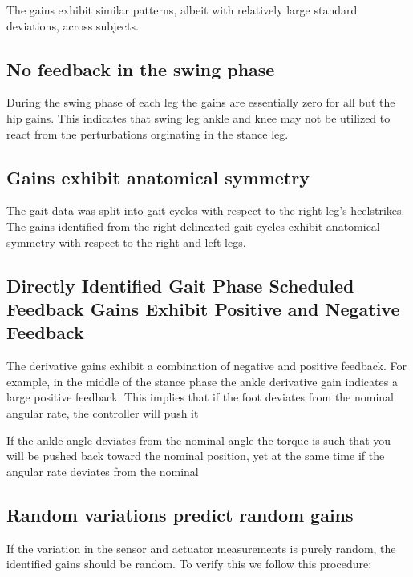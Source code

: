 \documentclass{article}
\begin{document}
The gains exhibit similar patterns, albeit with relatively large standard
deviations, across subjects.

\subsection*{No feedback in the swing phase}
%
During the swing phase of each leg the gains are essentially zero for all but
the hip gains. This indicates that swing leg ankle and knee may not be utilized
to react from the perturbations orginating in the stance leg.


\subsection*{Gains exhibit anatomical symmetry}
%
The gait data was split into gait cycles with respect to the right leg's
heelstrikes. The gains identified from the right delineated gait cycles exhibit
anatomical symmetry with respect to the right and left legs.

\subsection*{Directly Identified Gait Phase Scheduled Feedback Gains Exhibit
  Positive and Negative Feedback}
%
The derivative gains exhibit a combination of negative and positive feedback.
For example, in the middle of the stance phase the ankle derivative gain
indicates a large positive feedback. This implies that if the foot deviates
from the nominal angular rate, the controller will push it

If the ankle angle deviates from the nominal angle the torque is such that you
will be pushed back toward the nominal position, yet at the same time if the
angular rate deviates from the nominal


\subsection*{Random variations predict random gains}
%
If the variation in the sensor and actuator measurements is purely random, the
identified gains should be random. To verify this we follow this procedure:
\end{document}
